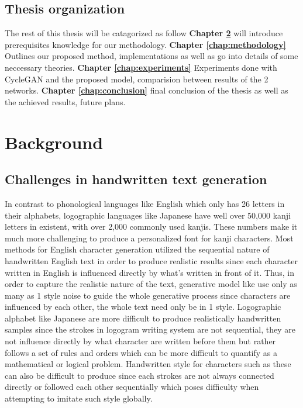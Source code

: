 \documentclass[12pt]{report}
\begin{document}
\section{Thesis organization}
The rest of this thesis will be catagorized as follow \textbf{Chapter \ref{chap:background}} will introduce prerequisites knowledge for our methodology. \textbf{Chapter \ref{chap:methodology}} Outlines our proposed method, implementations as well as go into details of some neccessary theories. \textbf{Chapter \ref{chap:experiments}} Experiments done with CycleGAN and the proposed model, comparision between results of the 2 networks. \textbf{Chapter \ref{chap:conclusion}} final conclusion of the thesis as well as the achieved results, future plans.


\newpage	
\chapter{Background}
\label{chap:background}

\section{Challenges in handwritten text generation}

In contrast to phonological languages like English which only has 26 letters in their alphabets, logographic languages like Japanese have well over 50,000 kanji letters in existent, with over 2,000 commonly used kanjis. These numbers make it much more challenging to produce a personalized font for kanji characters.
Most methods for English character generation utilized the sequential nature of handwritten English text in order to produce realistic results since each character written in English is influenced directly by what’s written in front of it. Thus, in order to capture the realistic nature of the text, generative model like \cite{scrabble-gan} use only as many as 1 style noise to guide the whole generative process since characters are influenced by each other, the whole text need only be in 1 style. Logographic alphabet like Japanese are more difficult to produce realistically handwritten samples since the strokes in logogram writing system are not sequential, they are not influence directly by what character are written before them but rather follows a set of rules and orders which can be more difficult to quantify as a mathematical or logical problem. Handwritten style for characters such as these can also be difficult to produce since each strokes are not always connected directly or followed each other sequentially which poses difficulty when attempting to imitate such style globally.
\end{document}

